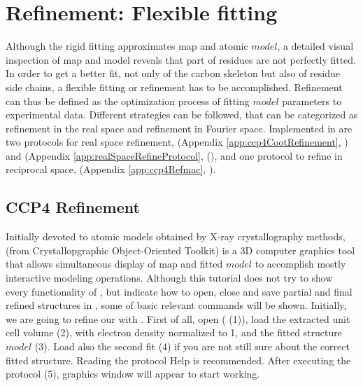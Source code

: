 \section{Refinement: Flexible fitting}
\label{refinementFlexibleFitting}
Although the rigid fitting approximates map and atomic $model$, a detailed visual inspection of map and model reveals that part of residues are not perfectly fitted. In order to get a better fit, not only of the carbon skeleton but also of residue side chains, a flexible fitting or refinement has to be accomplished. Refinement can thus be defined as the optimization process of fitting $model$ parameters to experimental data. Different strategies can be followed, that can be categorized as refinement in the real space and refinement in Fourier space. Implemented in \scipion are two protocols for real space refinement,  (Appendix \ref{app:ccp4CootRefinement}, \citep{emsley2010}) and  (Appendix \ref{app:realSpaceRefineProtocol}, (\citep{afonine2018}), and one protocol to refine in reciprocal space,  (Appendix \ref{app:ccp4Refmac}, \citep{vagin2004}).

 \subsection*{CCP4 \coot Refinement}
 
 Initially devoted to atomic models obtained by X-ray crystallography methods, \coot (from Crystallopgraphic Object-Oriented Toolkit) is a 3D computer graphics tool that allows simultaneous display of map and fitted $model$ to accomplish mostly interactive modeling operations. Although this tutorial does not try to show every functionality of \coot, but indicate how to open, close and save partial and final \coot refined structures in \scipion, some of \coot basic relevant commands will be shown. Initially, we are going to refine our  with \coot. First of all, open  ( (1)), load the extracted unit cell volume (2), with electron density normalized to 1, and the fitted structure $model$ (3). Load also the second fit (4) if you are not still sure about the correct fitted structure. Reading the protocol Help is recommended. After executing the protocol (5), \coot graphics window will appear to start working. 
 
